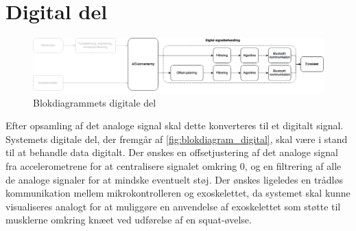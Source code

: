 \section{Digital del}
\begin{figure}[H]
\centering
\includegraphics[width=1\textwidth]{figures/implementering/Blokdiagram_digital.png}
\caption{Blokdiagrammets digitale del}
\label{fig:blokdiagram_digital}
\end{figure}

\noindent
Efter opsamling af det analoge signal skal dette konverteres til et digitalt signal. Systemets digitale del, der fremgår af \autoref{fig:blokdiagram_digital}, skal være i stand til at behandle data digitalt. Der ønskes en offsetjustering af det analoge signal fra accelerometrene for at centralisere signalet omkring 0, og en filtrering af alle de analoge signaler for at mindske eventuelt støj. Der ønskes ligeledes en trådløs kommunikation mellem mikrokontrolleren og exoskelettet, da systemet skal kunne visualiseres analogt for at muliggøre en anvendelse af exoskelettet som støtte til musklerne omkring knæet ved udførelse af en squat-øvelse.


 


